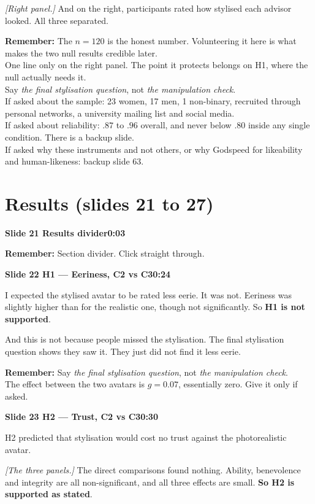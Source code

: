 \documentclass[11pt,a4paper]{article}
\newcommand{\slidehead}[3]{%
  \needspace{5\baselineskip}
  \vspace{0.9em}
  \noindent\colorbox{knblue}{\parbox{0.978\textwidth}{\vspace{1pt}\color{white}\textbf{Slide #1 \quad #2}\hfill\textbf{#3}\vspace{1pt}}}
  \vspace{0.35em}\par}
\newcommand{\remind}[1]{%
  \vspace{0.15em}
  \noindent\colorbox{knlight}{\parbox{0.972\textwidth}{\small\color{knblue}\textbf{Remember:} #1}}
  \vspace{0.2em}\par}
\newcommand{\pointto}[1]{{\color{knaccent}\textit{[#1]}}}
\begin{document}
\pointto{Right panel.} And on the right, participants rated how stylised each advisor looked. All three separated.

\remind{The $n=120$ is the honest number. Volunteering it here is what makes the two null results credible later.\\[0.4em] One line only on the right panel. The point it protects belongs on H1, where the null actually needs it.\\[0.4em] Say \emph{the final stylisation question}, not \emph{the manipulation check}.\\[0.4em] If asked about the sample: 23 women, 17 men, 1 non-binary, recruited through personal networks, a university mailing list and social media.\\[0.4em] If asked about reliability: $.87$ to $.96$ overall, and never below $.80$ inside any single condition. There is a backup slide.\\[0.4em] If asked why these instruments and not others, or why Godspeed for likeability and human-likeness: backup slide 63.}

\section*{\color{knblue}Results (slides 21 to 27)}

\slidehead{21}{Results divider}{0:03}

\remind{Section divider. Click straight through.}

\slidehead{22}{H1 — Eeriness, C2 vs C3}{0:24}

I expected the stylised avatar to be rated less eerie. It was not. Eeriness was slightly higher than for the realistic one, though not significantly. So \textbf{H1 is not supported}.

And this is not because people missed the stylisation. The final stylisation question shows they saw it. They just did not find it less eerie.

\remind{Say \emph{the final stylisation question}, not \emph{the manipulation check}.\\[0.4em] The effect between the two avatars is $g=0.07$, essentially zero. Give it only if asked.}

\slidehead{23}{H2 — Trust, C2 vs C3}{0:30}

H2 predicted that stylisation would cost no trust against the photorealistic avatar.

\pointto{The three panels.} The direct comparisons found nothing. Ability, benevolence and integrity are all non-significant, and all three effects are small. \textbf{So H2 is supported as stated}.
\end{document}
